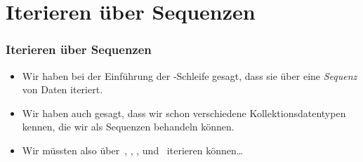 \documentclass[aspectratio=169,mathserif,notheorems]{beamer}%
\begin{document}
\section{Iterieren über Sequenzen}%
%
\begin{frame}%
\frametitle{Iterieren über Sequenzen}%
\begin{itemize}%
\item Wir haben bei der Einführung der -Schleife gesagt, dass sie über eine \emph{Sequenz} von Daten iteriert.%
%
\item<2-> Wir haben auch gesagt, dass wir schon verschiedene Kollektionsdatentypen kennen, die wir als Sequenzen behandeln können.%
%
\item<3-> Wir müssten also über~, , , und~ iterieren können\dots%
\end{itemize}%
\end{frame}%
%
\end{document}
